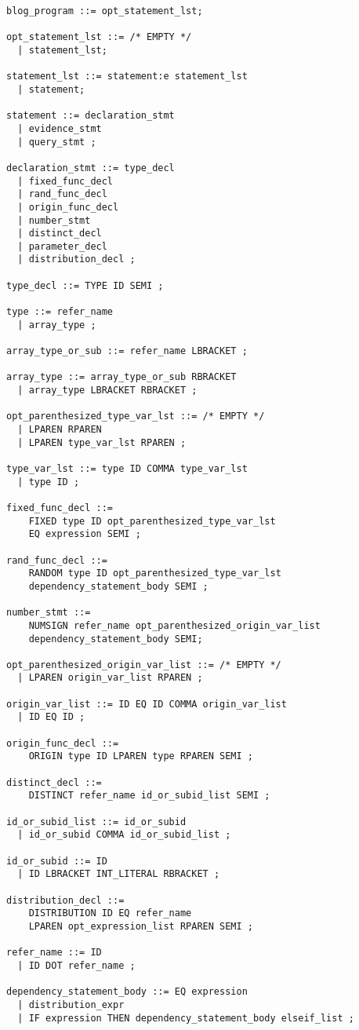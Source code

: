 \documentclass[12pt]{article}
\begin{document}
\begin{verbatim}
blog_program ::= opt_statement_lst;

opt_statement_lst ::= /* EMPTY */ 
  | statement_lst;

statement_lst ::= statement:e statement_lst
  | statement;

statement ::= declaration_stmt 
  | evidence_stmt 
  | query_stmt ;

declaration_stmt ::= type_decl
  | fixed_func_decl
  | rand_func_decl
  | origin_func_decl 
  | number_stmt 
  | distinct_decl 
  | parameter_decl 
  | distribution_decl ;

type_decl ::= TYPE ID SEMI ;

type ::= refer_name
  | array_type ;

array_type_or_sub ::= refer_name LBRACKET ;

array_type ::= array_type_or_sub RBRACKET
  | array_type LBRACKET RBRACKET ;

opt_parenthesized_type_var_lst ::= /* EMPTY */
  | LPAREN RPAREN
  | LPAREN type_var_lst RPAREN ;

type_var_lst ::= type ID COMMA type_var_lst
  | type ID ;

fixed_func_decl ::=
    FIXED type ID opt_parenthesized_type_var_lst 
    EQ expression SEMI ;

rand_func_decl ::=
    RANDOM type ID opt_parenthesized_type_var_lst 
    dependency_statement_body SEMI ;

number_stmt ::=
    NUMSIGN refer_name opt_parenthesized_origin_var_list
    dependency_statement_body SEMI;

opt_parenthesized_origin_var_list ::= /* EMPTY */
  | LPAREN origin_var_list RPAREN ;

origin_var_list ::= ID EQ ID COMMA origin_var_list
  | ID EQ ID ;

origin_func_decl ::= 
    ORIGIN type ID LPAREN type RPAREN SEMI ;

distinct_decl ::=
    DISTINCT refer_name id_or_subid_list SEMI ;

id_or_subid_list ::= id_or_subid
  | id_or_subid COMMA id_or_subid_list ;

id_or_subid ::= ID
  | ID LBRACKET INT_LITERAL RBRACKET ;

distribution_decl ::=
    DISTRIBUTION ID EQ refer_name
    LPAREN opt_expression_list RPAREN SEMI ;

refer_name ::= ID
  | ID DOT refer_name ;

dependency_statement_body ::= EQ expression
  | distribution_expr
  | IF expression THEN dependency_statement_body elseif_list ;


\end{verbatim}
\end{document}
